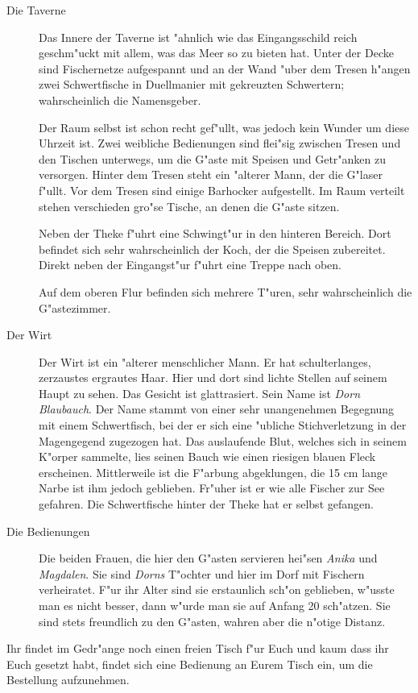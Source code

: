 \begin{description}
\item [Die Taverne] Das Innere der Taverne ist "ahnlich wie das Eingangsschild reich geschm"uckt mit allem, was das Meer so zu bieten hat. Unter der Decke sind Fischernetze aufgespannt und an der Wand "uber dem Tresen h"angen zwei Schwertfische in Duellmanier mit gekreuzten Schwertern; wahrscheinlich die Namensgeber.
\par Der Raum selbst ist schon recht gef"ullt, was jedoch kein Wunder um diese Uhrzeit ist. Zwei weibliche Bedienungen sind flei"sig zwischen Tresen und den Tischen unterwegs, um die G"aste mit Speisen und Getr"anken zu versorgen. Hinter dem Tresen steht ein "alterer Mann, der die G"laser f"ullt. Vor dem Tresen sind einige Barhocker aufgestellt. Im Raum verteilt stehen verschieden gro"se Tische, an denen die G"aste sitzen.
\par Neben der Theke f"uhrt eine Schwingt"ur in den hinteren Bereich. Dort befindet sich sehr wahrscheinlich der Koch, der die Speisen zubereitet. Direkt neben der Eingangst"ur f"uhrt eine Treppe nach oben.
\par Auf dem oberen Flur befinden sich mehrere T"uren, sehr wahrscheinlich die G"astezimmer.
\item [Der Wirt] Der Wirt ist ein "alterer menschlicher Mann. Er hat schulterlanges, zerzaustes ergrautes Haar. Hier und dort sind lichte Stellen auf seinem Haupt zu sehen. Das Gesicht ist glattrasiert. Sein Name ist \textit{Dorn Blaubauch}. Der Name stammt von einer sehr unangenehmen Begegnung mit einem Schwertfisch, bei der er sich eine "ubliche Stichverletzung in der Magengegend zugezogen hat. Das auslaufende Blut, welches sich in seinem K"orper sammelte, lies seinen Bauch wie einen riesigen blauen Fleck erscheinen. Mittlerweile ist die F"arbung abgeklungen, die 15 cm lange Narbe ist ihm jedoch geblieben. Fr"uher ist er wie alle Fischer zur See gefahren. Die Schwertfische hinter der Theke hat er selbst gefangen.
\item [Die Bedienungen] Die beiden Frauen, die hier den G"asten servieren hei"sen \textit{Anika} und \textit{Magdalen}. Sie sind \textit{Dorns} T"ochter und hier im Dorf mit Fischern verheiratet. F"ur ihr Alter sind sie erstaunlich sch"on geblieben, w"usste man es nicht besser, dann w"urde man sie auf Anfang 20 sch"atzen. Sie sind stets freundlich zu den G"asten, wahren aber die n"otige Distanz.
\end{description}

\par Ihr findet im Gedr"ange noch einen freien Tisch f"ur Euch und kaum dass ihr Euch gesetzt habt, findet sich eine Bedienung an Eurem Tisch ein, um die Bestellung aufzunehmen.

